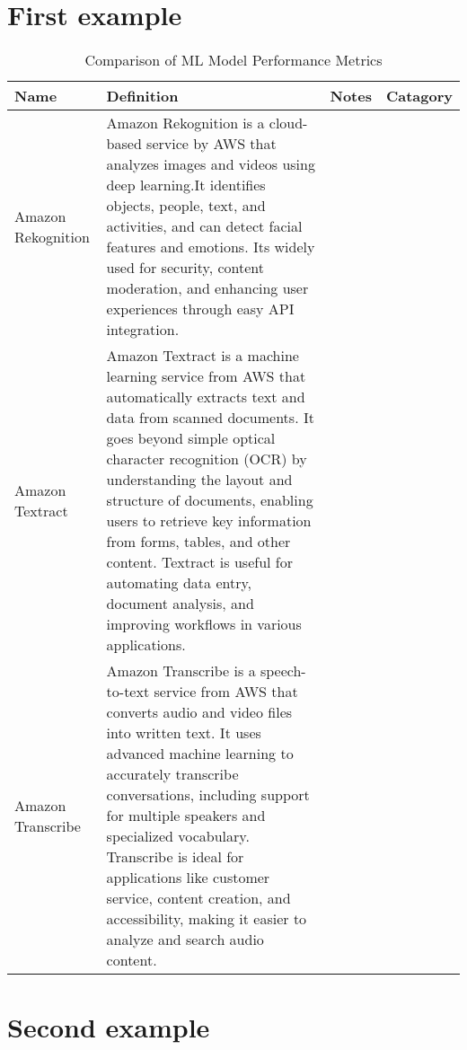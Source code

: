 \documentclass{article}
\begin{document}
\begin{landscape}
\section{First example}
\begin{table}[htbp]
    \caption{Comparison of ML Model Performance Metrics}
    \label{tab:model_comparison}
    \begin{tabulary}{\linewidth}{LLLL}
    \toprule
    Name & Definition & Notes & Catagory \\
    \midrule
    Amazon Rekognition & Amazon Rekognition is a cloud-based service by AWS that analyzes images and videos using deep learning.It identifies objects, people, text, and activities, and can detect facial features and emotions. Its widely used for security, content moderation, and enhancing user experiences through easy API integration. &  &  \\
    \midrule
    Amazon Textract & Amazon Textract is a machine learning service from AWS that automatically extracts text and data from scanned documents. It goes beyond simple optical character recognition (OCR) by understanding the layout and structure of documents, enabling users to retrieve key information from forms, tables, and other content. Textract is useful for automating data entry, document analysis, and improving workflows in various applications. &  &  \\
    \midrule
    Amazon Transcribe & Amazon Transcribe is a speech-to-text service from AWS that converts audio and video files into written text. It uses advanced machine learning to accurately transcribe conversations, including support for multiple speakers and specialized vocabulary. Transcribe is ideal for applications like customer service, content creation, and accessibility, making it easier to analyze and search audio content. &  &  \\
    \bottomrule
    \end{tabulary}
    \end{table}


\section{Second example}
\end{landscape}
\end{document}
